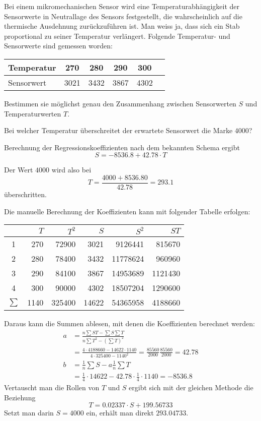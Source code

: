 Bei einem mikromechanischen Sensor wird eine Temperaturabhängigkeit
der Sensorwerte in Neutrallage des Sensors festgestellt,
die wahrscheinlich auf die thermische
Ausdehnung zurückzuführen ist. Man weiss ja, dass sich
ein Stab proportional zu seiner Temperatur verlängert. Folgende
Temperatur- und Sensorwerte sind gemessen worden:
\begin{center}
\begin{tabular}{l|c|c|c|c|c}
Temperatur&270&280&290&300\\
\hline
Sensorwert&3021&3432&3867&4302\\
\end{tabular}
\end{center}
\begin{teilaufgaben}
\item Bestimmen sie möglichst genau den Zusammenhang zwischen
Sensorwerten $S$ und Temperaturwerten $T$.
\item Bei welcher Temperatur überschreitet der erwartete Sensorwert
die Marke $4000$?
\end{teilaufgaben}

\begin{loesung}
\begin{teilaufgaben}
\item Berechnung der Regressionskoeffizienten nach dem bekannten
Schema ergibt
\[
S=-8536.8 + 42.78\cdot T
\]
\item
Der Wert $4000$ wird also bei
\[
T=\frac{4000 + 8536.80}{42.78}=293.1
\]
überschritten.
\end{teilaufgaben}
Die manuelle Berechnung der Koeffizienten kann mit folgender Tabelle
erfolgen:
\begin{center}
\begin{tabular}{|c|r|r|r|r|r|}
\hline
&$T$&$T^2$&$S$&$S^2$&$ST$\\
\hline
1&270&72900& 3021& 9126441& 815670\\
2&280&78400& 3432& 11778624& 960960\\
3&290&84100& 3867& 14953689& 1121430\\
4&300&90000& 4302& 18507204& 1290600\\
\hline
$\sum$&1140& 325400& 14622& 54365958& 4188660\\
\hline
\end{tabular}
\end{center}
Daraus kann die Summen ablesen, mit denen die Koeffizienten berechnet
werden:
\begin{align*}
a&=\frac{n\sum ST-\sum S\sum T}{n\sum T^2-(\sum T)^2}
\\
&=
\frac{
4\cdot 4188660 - 14622\cdot 1140
}{
4\cdot 325400 - 1140^2
}
=
\frac{
85560
}{
2000
}
\frac{85560}{2000}
=42.78
\\
b&=\textstyle \frac1n\sum S-a\frac1n\sum T
\\
&=
\frac14\cdot 14622-42.78\cdot\frac14\cdot 1140
=-8536.8
\end{align*}
Vertauscht man die Rollen von $T$ und $S$ ergibt sich mit der
gleichen Methode die Beziehung
\[
T=0.02337\cdot S +199.56733
\]
Setzt man darin $S=4000$ ein, erhält man direkt
$293.04733$.
\end{loesung}

